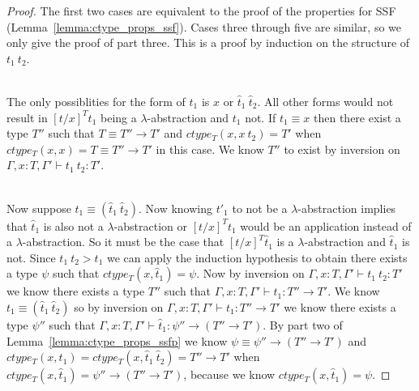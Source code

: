 \begin{proof}
  The first two cases are equivalent to the proof of the properties
  for SSF (Lemma~\ref{lemma:ctype_props_ssf}).  Cases three through five are similar, so we only give the
  proof of part three.  This is a proof by induction on the structure
  of $t_1\ t_2$.

  \ \\
  The only possiblities for the form of $t_1$ is $x$ or $\hat{t}_1\ \hat{t}_2$.  All other 
  forms would not result in $[t/x]^T t_1$ being a $\lambda$-abstraction and $t_1$ not.
  If $t_1 \equiv x$ then there exist a type $T''$ such that $T \equiv T'' \to T'$ and
  $ctype_T(x,x\ t_2) = T'$ when $ctype_T(x,x) = T \equiv T'' \to T'$ in this case.  We know
  $T''$ to exist by inversion on $\Gamma,x:T,\Gamma' \vdash t_1\ t_2:T'$.

  \ \\
  Now suppose $t_1 \equiv (\hat{t}_1\ \hat{t}_2)$.  Now knowing $t'_1$ to not be a $\lambda$-abstraction
  implies that $\hat{t}_1$ is also not a $\lambda$-abstraction or $[t/x]^T t_1$ would be an application
  instead of a $\lambda$-abstraction.  So it must be the case that $[t/x]^T \hat{t}_1$ is a $\lambda$-abstraction
  and $\hat{t}_1$ is not.  Since $t_1\ t_2 > t_1$ we can apply the induction hypothesis to obtain there exists
  a type $\psi$ such that $ctype_T(x,\hat{t}_1) = \psi$.  
  Now by inversion on $\Gamma,x:T,\Gamma' \vdash t_1\ t_2:T'$ we know there exists a type $T''$ such that
  $\Gamma,x:T,\Gamma' \vdash t_1:T'' \to T'$.  We know $t_1 \equiv (\hat{t}_1\ \hat{t}_2)$ so by inversion on
  $\Gamma,x:T,\Gamma' \vdash t_1:T'' \to T'$ we know there exists a type $\psi''$ such that
  $\Gamma,x:T,\Gamma' \vdash \hat{t}_1:\psi'' \to (T'' \to T')$.
  By part two of Lemma~\ref{lemma:ctype_props_ssfp} we know $\psi \equiv \psi'' \to (T'' \to T')$ and
  $ctype_T(x,t_1) = ctype_T(x,\hat{t}_1\ \hat{t}_2) = T'' \to T'$ 
  when $ctype_T(x,\hat{t}_1) = \psi'' \to (T'' \to T')$, because we know $ctype_T(x,\hat{t}_1) = \psi$.
\end{proof}

